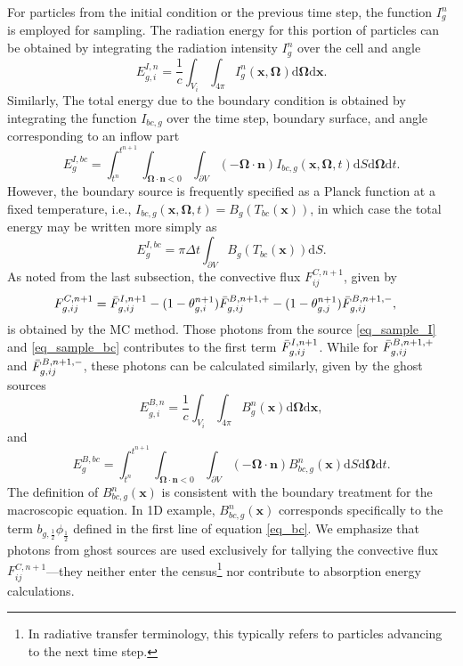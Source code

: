 \documentclass[preprint,12pt]{elsarticle}
\theoremstyle{definition}
\theoremstyle{plain}
\numberwithin{equation}{section}
\numberwithin{algorithm}{section}
\newcounter{eq_count}
\newcommand{\half}{\frac{1}{2}}
\newcommand{\vOmega}{\mathbf{\Omega}}
\newcommand{\vx}{\mathbf{x}}
\newcommand{\dd}{{\text{d}}}
\begin{document}
 For particles from the initial condition or the previous time step,  the function $I_g^n$ is employed for sampling. The radiation energy for this portion of particles can be obtained by integrating the radiation intensity $I^n_g$ over the cell and angle
\begin{equation}\label{eq_sample_I}
    E_{g,i}^{I,n} = \frac{1}{c} \int_{V_i} \int_{4\pi} I^n_g(\vx,\vOmega) \dd{\vOmega} \dd{\vx}.
\end{equation}
Similarly, The total energy due to the boundary condition is obtained by integrating the function $I_{bc,g}$ over the time step, boundary surface, and angle corresponding to an inflow part
\begin{equation}\label{eq_sample_bc}
    E_{g}^{I,bc} = \int_{t^{n}}^{t^{n+1}}   \int_{\vOmega\cdot\mathbf{n}<0 } \int_{\partial V} ( - \vOmega\cdot\mathbf{n}) I_{bc,g}(\vx,\vOmega,t) \dd{S} \dd{\vOmega}  \dd{t}.
\end{equation}
However, the boundary source is frequently
specified as a Planck function at a fixed temperature, i.e., $I_{bc,g}(\vx,\vOmega,t) = B_g\left(T_{bc}\left( \vx\right)\right)$, in which case the total energy may be written more simply as
\begin{equation*}
    E_{g}^{I,bc} = \pi  \Delta t   \int_{\partial V} B_g(T_{bc} \left( \vx\right) )  \dd{S}.
\end{equation*}
As noted from the last subsection, the convective flux $F^{C,n+1}_{ij}$, given by
\begin{equation*}         
        \begin{aligned}  
            &F_{g,ij}^{C,n+1} =  
            \Bar{F}_{g,ij}^{I,n+1} 
            - (1 - \theta_{g,i}^{n+1}) \Bar{F}_{g,ij}^{B,n+1,+}
            - (1 - \theta_{g,j}^{n+1}) \Bar{F}_{g,ij}^{B,n+1,-},
        \end{aligned}
    \end{equation*}
is obtained by the MC method.
Those photons from the source \eqref{eq_sample_I} and \eqref{eq_sample_bc} contributes to the first term $\Bar{F}_{g,ij}^{I,n+1} $. While for $\Bar{F}_{g,ij}^{B,n+1,+}$ and $\Bar{F}_{g,ij}^{B,n+1,-}$, these photons can be calculated similarly, given by the ghost sources
\begin{equation}\label{eq_sample_B}
    E_{g,i}^{B,n} = \frac{1}{c} \int_{V_i} \int_{4\pi} B^n_g(\vx) \dd{\vOmega} \dd{\vx},
\end{equation}
and
\begin{equation}\label{eq_sample_B_bc}
    E_{g}^{B,bc} = \int_{t^{n}}^{t^{n+1}}   \int_{\vOmega\cdot\mathbf{n}<0 } \int_{\partial V} ( - \vOmega\cdot\mathbf{n}) B_{bc,g}^n(\vx) \dd{S} \dd{\vOmega}  \dd{t}.
\end{equation}
The definition of $B_{bc,g}^n(\vx)$ is consistent with the boundary treatment for the macroscopic equation. In 1D example, $B_{bc,g}^n(\vx)$ corresponds specifically to the term $b_{g,\half}\phi_{\half}$ defined in the first line of equation \eqref{eq_bc}. We emphasize that photons from ghost sources are used exclusively for tallying the convective flux $F^{C,n+1}_{ij}$—they neither enter the census\footnote{In radiative transfer terminology, this typically refers to particles advancing to the next time step.} nor contribute to absorption energy calculations.
\end{document}
